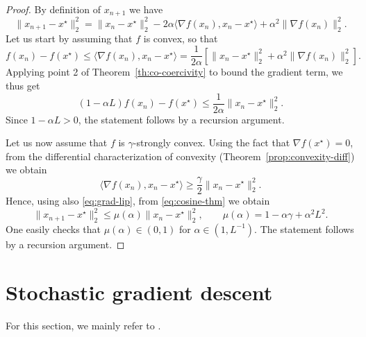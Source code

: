      \begin{proof}
         By definition of $x_{n+1}$ we have
         \begin{equation}
             \label{eq:cosine-thm}
             \|x_{n+1}-x^\star \|_2^2
             = \|x_n - x^\star\|_2^2 - 2 \alpha \langle \nabla f(x_n),x_n-x^\star \rangle  + \alpha^2 \|\nabla f(x_n)\|_2^2 .
         \end{equation}
         Let us start by assuming that $f$ is convex, so that
         \begin{equation}
             f(x_n)-f(x^\star) \le \langle \nabla f(x_n), x_n-x^\star \rangle
             = \frac{1}{2\alpha} \left[ \|x_n - x^\star\|_2^2 + \alpha^2 \|\nabla f(x_n)\|_2^2  \right].
         \end{equation}
         Applying point 2 of Theorem~\ref{th:co-coercivity} to bound the gradient term, we thus get
         \begin{equation}
             \left(1-{\alpha}{L}\right) f(x_n)-f(x^\star) \le \frac{1}{2\alpha}\|x_n - x^\star\|_2^2 .
         \end{equation}
         Since $1-{\alpha}{L}> 0$, the statement follows by a recursion argument.
 
         Let us now assume that $f$ is $\gamma$-strongly convex. Using the fact that $\nabla f(x^\star)=0$, from the differential characterization of convexity (Theorem~\ref{prop:convexity-diff}) we obtain
         \begin{equation}
             \langle\nabla f(x_n),x_n-x^\star\rangle \ge \frac\gamma2\|x_n-x^\star\|_2^2.
         \end{equation}
         Hence, using also \eqref{eq:grad-lip}, from \eqref{eq:cosine-thm} we obtain
         \begin{equation}
             \|x_{n+1}-x^\star \|_2^2 \le \mu(\alpha)\|x_n - x^\star\|_2^2, \qquad \mu(\alpha) = 1 - \alpha \gamma + \alpha^2 L^2  .
         \end{equation}
         One easily checks that $\mu(\alpha)\in (0,1)$ for $\alpha\in (1,L^{-1})$. The statement follows by a recursion argument.
     \end{proof}
 
     \section{Stochastic gradient descent}
 
     For this section, we mainly refer to \cite{royerLecture}.
 
